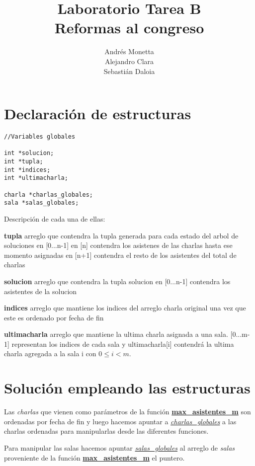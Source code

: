 \documentclass[11pt]{article}
\title{\textbf{Laboratorio Tarea B \\ Reformas al congreso}}
\author{Andrés Monetta\\
		Alejandro Clara\\
		Sebastián Daloia}
\date{}
\begin{document}
\maketitle
\newpage
\tableofcontents
\newpage
\section{Declaración de estructuras}

\begin{lstlisting}
//Variables globales

int *solucion;	
int *tupla;
int *indices;
int *ultimacharla;

charla *charlas_globales;
sala *salas_globales;

\end{lstlisting}

Descripción de cada una de ellas:

\textbf{tupla} arreglo que contendra la tupla generada para cada estado
	del arbol de soluciones en [0...n-1] \newline
	en [n] contendra los asistenes de las charlas hasta 
	ese momento asignadas \newline
	en [n+1] contendra el resto de los asistentes del total de charlas


\textbf{solucion} arreglo que contendra la tupla solucion en [0...n-1] \newline [n] contendra los asistentes de la solucion
		
\textbf{indices} arreglo que mantiene los indices del arreglo charla original
una vez que este es ordenado por fecha de fin

\textbf{ultimacharla} arreglo que mantiene la ultima charla asignada a una sala.
[0...m-1] representan los indices de cada sala y ultimacharla[i] contendrá la ultima charla agregada a la sala i con $0 \leq i < m$.
\newline 
\section{Solución empleando las estructuras}


Las \textit{charlas} que vienen como parámetros de la función \textbf{\url{max_asistentes_m}} son ordenadas por fecha de fin y luego hacemos apuntar a \textit{\url{charlas_globales}} a las charlas ordenadas para manipularlas desde las diferentes funciones. \newline

Para manipular las salas hacemos apuntar \textit{\url{salas_globales}} al arreglo de \textit{salas} proveniente de la función \textbf{\url{max_asistentes_m}} el puntero. \newline
\end{document}
